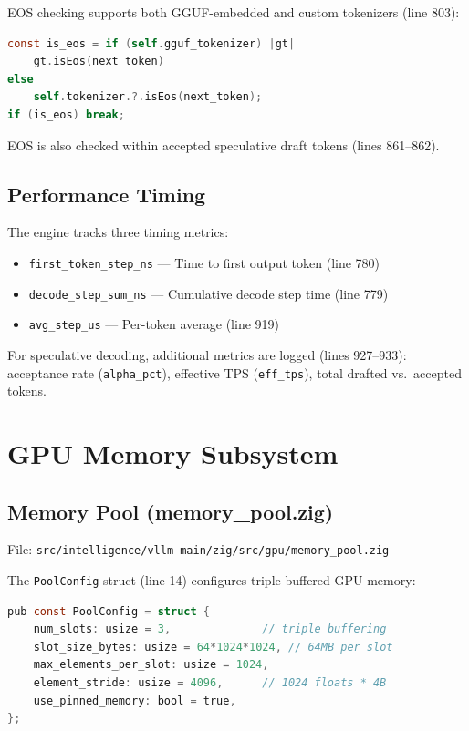\documentclass[11pt]{article}
\begin{document}
EOS checking supports both GGUF-embedded and custom tokenizers (line 803):

\begin{lstlisting}[language=C,caption={Dual EOS check (llama\_toon.zig:803)}]
const is_eos = if (self.gguf_tokenizer) |gt|
    gt.isEos(next_token)
else
    self.tokenizer.?.isEos(next_token);
if (is_eos) break;
\end{lstlisting}

EOS is also checked within accepted speculative draft tokens (lines 861--862).

\subsection{Performance Timing}

The engine tracks three timing metrics:
\begin{itemize}
  \item \texttt{first\_token\_step\_ns} --- Time to first output token (line 780)
  \item \texttt{decode\_step\_sum\_ns} --- Cumulative decode step time (line 779)
  \item \texttt{avg\_step\_us} --- Per-token average (line 919)
\end{itemize}

For speculative decoding, additional metrics are logged (lines 927--933):
acceptance rate (\texttt{alpha\_pct}), effective TPS (\texttt{eff\_tps}),
total drafted vs.\ accepted tokens.

\section{GPU Memory Subsystem}
\label{sec:memory}

\subsection{Memory Pool (memory\_pool.zig)}

File: \texttt{src/intelligence/vllm-main/zig/src/gpu/memory\_pool.zig}

The \texttt{PoolConfig} struct (line 14) configures triple-buffered GPU memory:

\begin{lstlisting}[language=C,caption={Memory pool config (memory\_pool.zig:14--25)}]
pub const PoolConfig = struct {
    num_slots: usize = 3,              // triple buffering
    slot_size_bytes: usize = 64*1024*1024, // 64MB per slot
    max_elements_per_slot: usize = 1024,
    element_stride: usize = 4096,      // 1024 floats * 4B
    use_pinned_memory: bool = true,
};
\end{lstlisting}
\end{document}
